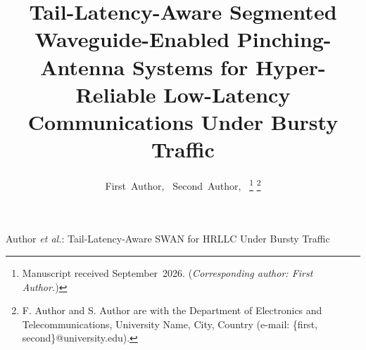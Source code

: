 \documentclass[journal]{IEEEtran}
\begin{document}
\title{Tail-Latency-Aware Segmented Waveguide-Enabled Pinching-Antenna Systems for Hyper-Reliable Low-Latency Communications Under Bursty Traffic}

\author{First~Author,~
        Second~Author,~%
\thanks{Manuscript received September~2026. (\emph{Corresponding author: First Author.})}%
\thanks{F. Author and S. Author are with the Department of Electronics and Telecommunications, University Name, City, Country (e-mail: \{first, second\}@university.edu).}}

%
{Author \MakeLowercase{\textit{et al.}}: Tail-Latency-Aware SWAN for HRLLC Under Bursty Traffic}

\maketitle
\end{document}

